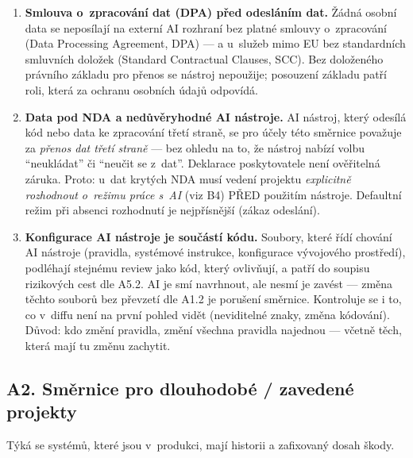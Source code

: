 \begin{enumerate}[label=\textbf{A1.\arabic*}]
Bez tohoto převzetí kód do těchto oblastí nesmí, byť \enquote{funguje}.
\item \textbf{Smlouva o~zpracování dat (DPA) před odesláním dat.}
Žádná osobní data se neposílají na externí AI rozhraní bez platné smlouvy o~zpracování (Data Processing Agreement, DPA) --- a u~služeb mimo EU bez standardních smluvních doložek (Standard Contractual Clauses, SCC).
Bez doloženého právního základu pro přenos se nástroj nepoužije; posouzení základu patří roli, která za ochranu osobních údajů odpovídá.
\item \textbf{Data pod NDA a nedůvěryhodné AI nástroje.}
AI nástroj, který odesílá kód nebo data ke zpracování třetí straně, se pro účely této směrnice považuje za \emph{přenos dat třetí straně} --- bez ohledu na to, že nástroj nabízí volbu \enquote{neukládat} či \enquote{neučit se z~dat}.
Deklarace poskytovatele není ověřitelná záruka.
Proto: u~dat krytých NDA musí vedení projektu \emph{explicitně rozhodnout o~režimu práce s~AI} (viz B4) PŘED použitím nástroje.
Defaultní režim při absenci rozhodnutí je nejpřísnější (zákaz odeslání).
\item \textbf{Konfigurace AI nástroje je součástí kódu.}
Soubory, které řídí chování AI nástroje (pravidla, systémové instrukce, konfigurace vývojového prostředí), podléhají stejnému review jako kód, který ovlivňují, a patří do soupisu rizikových cest dle A5.2.
AI je smí navrhnout, ale nesmí je zavést --- změna těchto souborů bez převzetí dle A1.2 je porušení směrnice.
Kontroluje se i to, co v~diffu není na první pohled vidět (neviditelné znaky, změna kódování).
Důvod: kdo změní pravidla, změní všechna pravidla najednou --- včetně těch, která mají tu změnu zachytit.
\end{enumerate}

\subsection{A2. Směrnice pro dlouhodobé / zavedené projekty}

Týká se systémů, které jsou v~produkci, mají historii a zafixovaný dosah škody.

